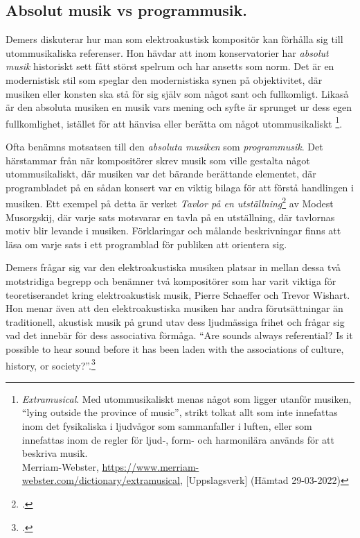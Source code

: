 \documentclass{article}
\begin{document}


\subsection{Absolut musik vs programmusik.}
Demers diskuterar hur man som elektroakustisk kompositör kan förhålla sig till utommusikaliska referenser.
Hon hävdar att inom konservatorier har \emph{absolut musik} historiskt sett fått störst spelrum och har ansetts
som norm. Det är en modernistisk stil som speglar den modernistiska synen på objektivitet, där musiken eller
konsten ska stå för sig själv som något sant och fullkomligt. Likaså är den absoluta musiken en musik vars
mening och syfte är sprunget ur dess egen fullkomlighet, istället för att hänvisa eller berätta om något
utommusikaliskt \footnote{\emph{Extramusical}. Med utommusikaliskt menas något som ligger utanför musiken,
``lying outside the province of music'', strikt tolkat allt som inte innefattas inom det fysikaliska i
ljudvågor som sammanfaller i luften, eller som innefattas inom de regler för ljud-, form- och harmonilära
används för att beskriva musik. \\ Merriam-Webster,
\url{https://www.merriam-webster.com/dictionary/extramusical}, [Uppslagsverk] (Hämtad
29-03-2022)}\nocite{webster}.

Ofta benämns motsatsen till den \emph{absoluta musiken} som \emph{programmusik}. Det härstammar från när
kompositörer skrev musik som ville gestalta något utommusikaliskt, där musiken var det bärande berättande
elementet, där programbladet på en sådan konsert var en viktig bilaga för att förstå handlingen i musiken.
Ett exempel på detta är verket \emph{Tavlor på en utställning}\footcite{Tavlor} av Modest Musorgskij,
där varje sats motsvarar en tavla på en utställning, där tavlornas motiv blir levande i musiken. Förklaringar
och målande beskrivningar finns att läsa om varje sats i ett programblad för publiken att orientera sig.

Demers frågar sig var den elektroakustiska musiken platsar in mellan dessa två motstridiga begrepp och
benämner två kompositörer som har varit viktiga för teoretiserandet kring elektroakustisk musik, Pierre
Schaeffer och Trevor Wishart. Hon menar även att den elektroakustiska musiken har andra
förutsättningar än traditionell, akustisk musik på grund utav dess ljudmässiga frihet och frågar sig vad det
innebär för dess associativa förmåga. ``Are sounds always referential? Is it possible to hear sound
before it has been laden with the associations of culture, history, or
society?''.\footcite[23]{JoannaDemers}
\end{document}
